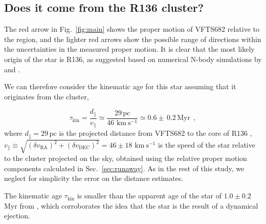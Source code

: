 \documentclass[apjl,twocolumn]{emulateapj}
\newcommand{\kms}{{\,\mathrm{km\ s^{-1}}}}
\DeclareRobustCommand{\Figref}[1]{Fig.~\ref{#1}}
\DeclareRobustCommand{\Secref}[1]{Sec.~\ref{#1}}
\begin{document}
\subsection{Does it come from the R136 cluster?}
\label{sec:r136_origin}

The red arrow in \Figref{fig:main} shows the proper motion of VFTS682
relative to the region, and the lighter red arrows show the possible
range of directions within the uncertainties in the measured proper
motion. It is clear that the most likely origin of the star is R136,
as suggested based on numerical N-body simulations by \cite{fujii:11}
and \cite{banerjee:12}.


We can therefore consider the kinematic age for this star assuming
that it originates from the cluster,

\begin{equation}
  \label{eq:kin_age}
  \tau_\mathrm{kin} = \frac{d_\parallel}{v_\parallel} \simeq
  \frac{29\,\mathrm{pc}}{46\,\kms} \simeq 0.6\pm\,0.2\, \mathrm{Myr} \ \ ,
\end{equation}
where $d_\parallel =29$\,pc is the projected distance from VFTS682 to
the core of R136 \citep[][]{bestenlehner:11}, $v_\parallel \equiv \sqrt{\left(\delta v_\mathrm{RA}\right)^2
    +\left(\delta v_\mathrm{DEC}\right)^2} =46\pm
18\,\kms$ is the speed of the star relative to the cluster projected on the sky, obtained
using the relative proper motion components calculated in
\Secref{sec:runaway}.%
As in the rest of this study, we neglect for
simplicity the error on the distance estimates.

The kinematic age $\tau_\mathrm{kin}$ is smaller than the apparent age
of the star of $1.0\pm 0.2$\,Myr from \cite{schneider:18}, which
corroborates the idea that the star is the result of a dynamical
ejection. 
\end{document}
